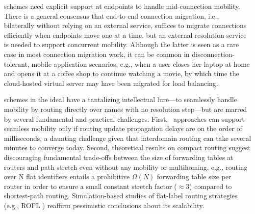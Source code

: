 
{\Logcen} schemes need explicit  support at endpoints to handle mid-connection mobility. There is a general consensus \cite{Migrate,ECCP,TCP-R} that end-to-end connection migration, i.e., bilaterally without relying on an external service,  suffices to migrate connections efficiently when endpoints move one at a time, but an external resolution service is needed to support concurrent mobility. Although the latter is seen as a rare case in most connection migration work, it can be common in disconnection-tolerant, mobile application scenarios, e.g., when a user closes her laptop at home and opens it at a coffee shop to continue watching a movie, by which time the cloud-hosted virtual server may have been migrated for load balancing.

{\textbf \Namerouting} schemes in the ideal have a tantalizing intellectual lure---to seamlessly handle mobility by routing directly over names  with no resolution step---but are marred by several fundamental and practical challenges. First, \namerouting\ approaches can support seamless mobility only if routing update propagation delays are on the order of milliseconds, a daunting challenge given that interdomain routing can take several minutes to converge today. Second, theoretical results on compact routing \cite{compact-routing} suggest discouraging fundamental trade-offs between the size of forwarding tables at routers and path stretch even without any mobility or multihoming, e.g.,  routing over N flat identifiers entails a prohibitive $\Omega(N)$ forwarding table size per router in order to ensure a small constant stretch factor ($\approx$3) compared to shortest-path routing. Simulation-based studies of flat-label routing strategies (e.g., ROFL \cite{ROFL}) reaffirm pessimistic conclusions about its scalability. 


